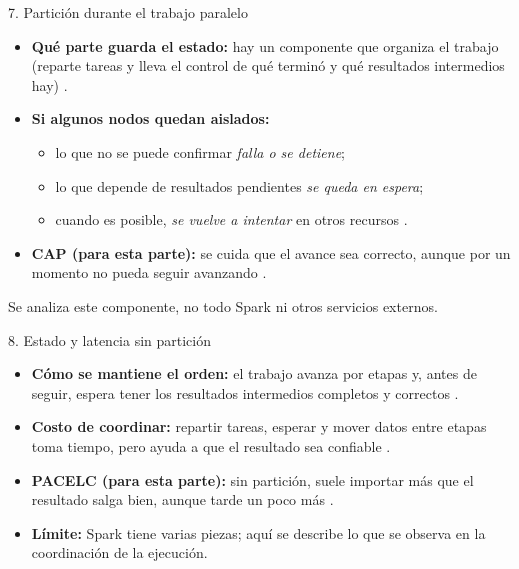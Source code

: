 \begin{frame}{7. Partición durante el trabajo paralelo}
  \begin{itemize}
    \item \textbf{Qué parte guarda el estado:} hay un componente que organiza el trabajo (reparte tareas y lleva el control de qué terminó y qué resultados intermedios hay) \cite{elhmadany2024,vandongen2021}.
    \item \textbf{Si algunos nodos quedan aislados:}
      \begin{itemize}
        \item lo que no se puede confirmar \textit{falla o se detiene};
        \item lo que depende de resultados pendientes \textit{se queda en espera};
        \item cuando es posible, \textit{se vuelve a intentar} en otros recursos \cite{vandongen2021,javed2023}.
      \end{itemize}
    \item \textbf{CAP (para esta parte):} se cuida que el avance sea correcto, aunque por un momento no pueda seguir avanzando \cite{vandongen2021,javed2023}.
  \end{itemize}
  {\footnotesize Se analiza este componente, no todo Spark ni otros servicios externos.}
\end{frame}

\begin{frame}{8. Estado y latencia sin partición}
  \begin{itemize}
    \item \textbf{Cómo se mantiene el orden:} el trabajo avanza por etapas y, antes de seguir, espera tener los resultados intermedios completos y correctos \cite{elhmadany2024,vandongen2021}.
    \item \textbf{Costo de coordinar:} repartir tareas, esperar y mover datos entre etapas toma tiempo, pero ayuda a que el resultado sea confiable \cite{mostafaei2022,elhmadany2024}.
    \item \textbf{PACELC (para esta parte):} sin partición, suele importar más que el resultado salga bien, aunque tarde un poco más \cite{vandongen2021,javed2023}.
    \item \textbf{Límite:} Spark tiene varias piezas; aquí se describe lo que se observa en la coordinación de la ejecución.
  \end{itemize}
\end{frame}

